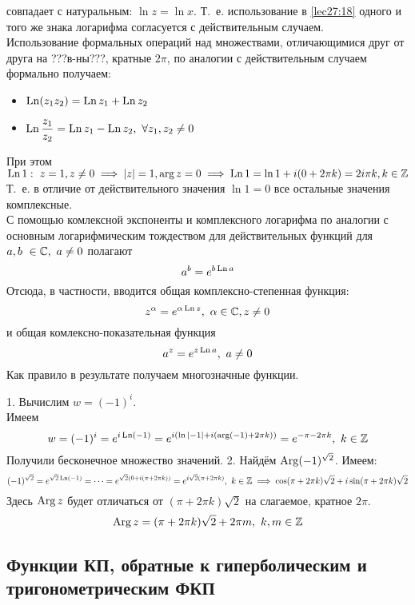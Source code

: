 \documentclass[../../main.tex]{subfiles}
\begin{document}
совпадает с натуральным: $ \ln z = \ln x $. Т.~е. использование в 
\eqref{lec27:18} одного и того же знака логарифма согласуется с действительным
случаем. \\
Использование формальных операций над множествами, отличающимися друг от друга
на ???в-ны???, кратные $ 2\pi $, по аналогии с действительным случаем 
формально
получаем:\\
\begin{itemize}
	\item $\operatorname{Ln}(z_1z_2) = \operatorname{Ln} z_1 + \operatorname{Ln} z_2$
	\item $\operatorname{Ln} \dfrac{z_1}{z_2} = \operatorname{Ln} z_1 - \operatorname{Ln} z_2,\ \forall z_1, z_2 \neq 0$
\end{itemize}
При этом $ \operatorname{Ln} 1:\ z = 1, z \neq 0 \implies |z| = 1, \arg z = 0 \implies 
\operatorname{Ln} 1 = \ln 1 + i(0 + 2\pi k) = 2i\pi k, 
k\in\mathbb{Z}
$
Т.~е. в отличие от действительного значения $ \ln 1 = 0 $ все остальные 
значения комплексные.\\
С помощью комлексной экспоненты и комплексного логарифма по аналогии с 
основным
логарифмическим тождеством для действительных функций для 
$ a, b\ \in \mathbb{C},\ a \neq 0 $ полагают 
\begin{equation}
\label{lec27:20}
a^b = e^{b \operatorname{Ln} a}
\end{equation}
Отсюда, в частности, вводится общая комплексно-степенная функция:
\begin{equation}
\label{lec27:21}
z^\alpha = e ^{\alpha \operatorname{Ln} z},\ \alpha \in \mathbb{C}, z \neq 0
\end{equation}
и общая комлексно-показательная функция 
\begin{equation}
\label{lec27:22}
a^z = e^{z \operatorname{Ln} a},\ a \neq 0
\end{equation}
Как правило в результате получаем многозначные функции.
\begin{exmps}
1. Вычислим $ w = (-1)^i $.\\
Имеем \[
w = (-1)^i = e^{i \operatorname{Ln}(-1)} = 
e^{i(\ln |-1| + i(\arg(-1) + 2\pi k))} = 
e^{-\pi - 2\pi k},\ k \in \mathbb{Z}
\]
Получили бесконечное множество значений.
2. Найдём $ \operatorname{Arg}(-1)^{\sqrt{2}} $. Имеем: \[
(-1)^{\sqrt{2}} = e^{\sqrt{2} \operatorname{Ln}(-1)} = \dots =
e^{\sqrt{2}(0 + i(\pi + 2\pi k))} = 
e^{i\sqrt{2}(\pi + 2\pi k)},\ k \in \mathbb{Z} \implies
\cos (\pi + 2\pi k)\sqrt{2} + i\sin(\pi + 2\pi k)\sqrt{2}
\]
Здесь $ \operatorname{Arg} z $ будет отличаться от $ (\pi + 2\pi k)\sqrt{2} $ на слагаемое, 
кратное $ 2\pi $.
\[
\Arg z = (\pi + 2\pi k)\sqrt{2} + 2\pi m,\ k, m \in \Z
\]
\end{exmps}

\subsection{Функции КП, обратные к гиперболическим и тригонометрическим ФКП}
\end{document}
